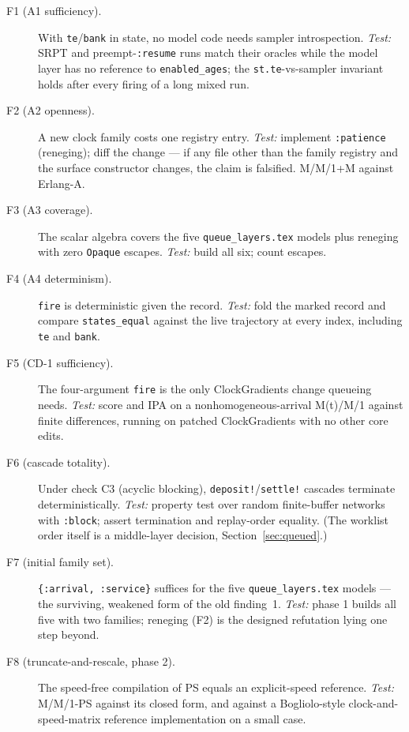\documentclass[11pt]{article}
\newcommand{\code}[1]{\texttt{#1}}
\begin{document}
\begin{description}
\item[F1 (A1 sufficiency).] With \code{te}/\code{bank} in state, no model
  code needs sampler introspection. \emph{Test:} SRPT and
  preempt-\code{:resume} runs match their oracles while the model layer has
  no reference to \code{enabled\_ages}; the \code{st.te}-vs-sampler
  invariant holds after every firing of a long mixed run.
\item[F2 (A2 openness).] A new clock family costs one registry entry.
  \emph{Test:} implement \code{:patience} (reneging); diff the change ---
  if any file other than the family registry and the surface constructor
  changes, the claim is falsified. M/M/1+M against Erlang-A.
\item[F3 (A3 coverage).] The scalar algebra covers the five
  \code{queue\_layers.tex} models plus reneging with zero \code{Opaque}
  escapes. \emph{Test:} build all six; count escapes.
\item[F4 (A4 determinism).] \code{fire} is deterministic given the record.
  \emph{Test:} fold the marked record and compare \code{states\_equal}
  against the live trajectory at every index, including \code{te} and
  \code{bank}.
\item[F5 (CD-1 sufficiency).] The four-argument \code{fire} is the only
  ClockGradients change queueing needs. \emph{Test:} score and IPA on a
  nonhomogeneous-arrival M(t)/M/1 against finite differences, running on
  patched ClockGradients with no other core edits.
\item[F6 (cascade totality).] Under check C3 (acyclic blocking),
  \code{deposit!}/\code{settle!} cascades terminate deterministically.
  \emph{Test:} property test over random finite-buffer networks with
  \code{:block}; assert termination and replay-order equality. (The
  worklist order itself is a middle-layer decision,
  Section~\ref{sec:queued}.)
\item[F7 (initial family set).] \code{\{:arrival, :service\}} suffices for
  the five \code{queue\_layers.tex} models --- the surviving, weakened form
  of the old finding~1. \emph{Test:} phase 1 builds all five with two
  families; reneging (F2) is the designed refutation lying one step beyond.
\item[F8 (truncate-and-rescale, phase 2).] The speed-free compilation of PS
  equals an explicit-speed reference. \emph{Test:} M/M/1-PS against its
  closed form, and against a Bogliolo-style clock-and-speed-matrix
  reference implementation on a small case.
\end{description}
\end{document}
